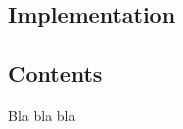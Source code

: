   \begin{titlepage}
    \vspace*{\fill}
      \part{Implementation}
    \vspace*{\fill}
  \end{titlepage}

\chapter*{Contents}

Bla bla bla


